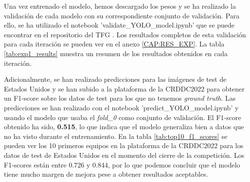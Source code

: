 Una vez entrenado el modelo, hemos descargado los pesos y se ha realizado la validación de cada modelo con su correspondiente conjunto de validación. Para ello, se ha utilizado el notebook 'validate\_YOLO\_model.ipynb' que se puede encontrar en el repositorio del TFG \cite{TFG_Repository}. Los resultados completos de esta validación para cada iteración se pueden ver en el anexo \ref{CAP:RES_EXP}. La tabla \ref{tab:exp1_results} muestra un resumen de los resultados obtenidos en cada iteración.

\begin{table}[H]
    \centering
    \caption{Resultados obtenidos en cada iteración del experimento 1.}
    \label{tab:exp1_results}
\end{table}

Adicionalmente, se han realizado predicciones para las imágenes de test de Estados Unidos y se han subido a la plataforma de la CRDDC2022 para obtener un F1-score sobre los datos de test para los que no tenemos \textit{ground truth}. Las predicciones se han realizado con el notebook 'predict\_YOLO\_model.ipynb' y usando el modelo que usaba el \textit{fold\_0} como conjunto de validación. El F1-score obtenido ha sido, \textbf{0.515}, lo que indica que el modelo generaliza bien a datos que no ha visto durante el entrenamiento. En la tabla \ref{tab:top10_f1_scores} se pueden ver los 10 primeros equipos en la plataforma de la CRDDC2022 para los datos de test de Estados Unidos en el momento del cierre de la competición. Los F1-scores están entre 0.726 y 0.844, por lo que podemos concluir que el modelo tiene mucho margen de mejora pese a obtener resultados aceptables.

